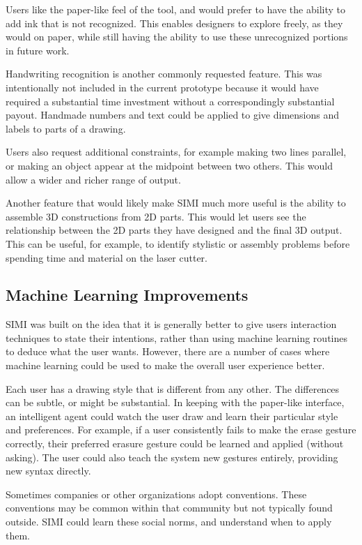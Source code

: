 Users like the paper-like feel of the tool, and would prefer to have
the ability to add ink that is not recognized. This enables designers
to explore freely, as they would on paper, while still having the
ability to use these unrecognized portions in future work.

Handwriting recognition is another commonly requested feature. This
was intentionally not included in the current prototype because it
would have required a substantial time investment without a
correspondingly substantial payout. Handmade numbers and text could be
applied to give dimensions and labels to parts of a drawing.

Users also request additional constraints, for example making two
lines parallel, or making an object appear at the midpoint between two
others. This would allow a wider and richer range of output.

Another feature that would likely make SIMI much more useful is the
ability to assemble 3D constructions from 2D parts. This would let
users see the relationship between the 2D parts they have designed and
the final 3D output. This can be useful, for example, to identify
stylistic or assembly problems before spending time and material on
the laser cutter.

\subsection{Machine Learning Improvements}

SIMI was built on the idea that it is generally better to give users
interaction techniques to state their intentions, rather than using
machine learning routines to deduce what the user wants. However,
there are a number of cases where machine learning could be used to
make the overall user experience better.

Each user has a drawing style that is different from any other. The
differences can be subtle, or might be substantial. In keeping with
the paper-like interface, an intelligent agent could watch the user
draw and learn their particular style and preferences. For example, if
a user consistently fails to make the erase gesture correctly, their
preferred erasure gesture could be learned and applied (without
asking). The user could also teach the system new gestures entirely,
providing new syntax directly.

Sometimes companies or other organizations adopt conventions. These
conventions may be common within that community but not typically
found outside. SIMI could learn these social norms, and understand
when to apply them.

